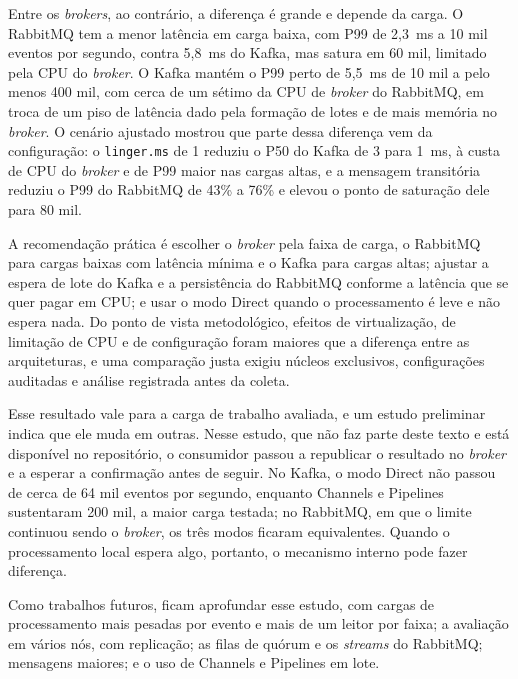 \documentclass[12pt]{article}
\begin{document}
Entre os \textit{brokers}, ao contrário, a diferença é grande e depende da carga. O RabbitMQ
tem a menor latência em carga baixa, com P99 de 2,3~ms a 10 mil eventos por segundo, contra
5,8~ms do Kafka, mas satura em 60 mil, limitado pela CPU do \textit{broker}. O Kafka mantém o
P99 perto de 5,5~ms de 10 mil a pelo menos 400 mil, com cerca de um sétimo da CPU de
\textit{broker} do RabbitMQ, em troca de um piso de latência dado pela formação de lotes e de
mais memória no \textit{broker}. O cenário ajustado mostrou que parte dessa diferença vem da
configuração: o \texttt{linger.ms} de 1 reduziu o P50 do Kafka de 3 para 1~ms, à custa de
CPU do \textit{broker} e de P99 maior nas cargas altas, e a mensagem transitória reduziu o P99
do RabbitMQ de 43\% a 76\% e elevou o ponto de saturação dele para 80 mil.

A recomendação prática é escolher o \textit{broker} pela faixa de carga, o RabbitMQ para cargas
baixas com latência mínima e o Kafka para cargas altas; ajustar a espera de lote do Kafka
e a persistência do RabbitMQ conforme a latência que se quer pagar em CPU; e usar o modo
Direct quando o processamento é leve e não espera nada. Do ponto de vista metodológico,
efeitos de virtualização, de limitação de CPU e de configuração foram maiores que a
diferença entre as arquiteturas, e uma comparação justa exigiu núcleos exclusivos,
configurações auditadas e análise registrada antes da coleta.

Esse resultado vale para a carga de trabalho avaliada, e um estudo preliminar indica que
ele muda em outras. Nesse estudo, que não faz parte deste texto e está disponível no
repositório, o consumidor passou a republicar o resultado no \textit{broker} e a esperar a
confirmação antes de seguir. No Kafka, o modo Direct não passou de cerca de 64 mil eventos
por segundo, enquanto Channels e Pipelines sustentaram 200 mil, a maior carga testada; no
RabbitMQ, em que o limite continuou sendo o \textit{broker}, os três modos ficaram equivalentes.
Quando o processamento local espera algo, portanto, o mecanismo interno pode fazer
diferença.

Como trabalhos futuros, ficam aprofundar esse estudo, com cargas de processamento mais
pesadas por evento e mais de um leitor por faixa; a avaliação em vários nós, com
replicação; as filas de quórum e os \textit{streams} do RabbitMQ; mensagens maiores; e o uso de
Channels e Pipelines em lote.




\end{document}
